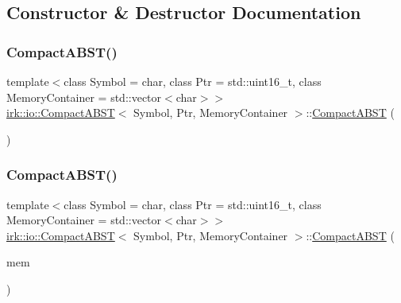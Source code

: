 \subsection{Constructor \& Destructor Documentation}
\mbox{\label{classirk_1_1io_1_1CompactABST_ac974514e8763630b313b9993705aa0ee}} 
\subsubsection{\texorpdfstring{Compact\+A\+B\+S\+T()}{CompactABST()}\hspace{0.1cm}{\footnotesize\ttfamily [1/2]}}
{\footnotesize\ttfamily template$<$class Symbol = char, class Ptr = std\+::uint16\+\_\+t, class Memory\+Container = std\+::vector$<$char$>$$>$ \\
\mbox{\hyperlink{classirk_1_1io_1_1CompactABST}{irk\+::io\+::\+Compact\+A\+B\+ST}}$<$ Symbol, Ptr, Memory\+Container $>$\+::\mbox{\hyperlink{classirk_1_1io_1_1CompactABST}{Compact\+A\+B\+ST}} (\begin{DoxyParamCaption}{ }\end{DoxyParamCaption})\hspace{0.3cm}{\ttfamily [default]}}

\mbox{\label{classirk_1_1io_1_1CompactABST_a107f624adb553882f94ef03d7cd087f7}} 
\subsubsection{\texorpdfstring{Compact\+A\+B\+S\+T()}{CompactABST()}\hspace{0.1cm}{\footnotesize\ttfamily [2/2]}}
{\footnotesize\ttfamily template$<$class Symbol = char, class Ptr = std\+::uint16\+\_\+t, class Memory\+Container = std\+::vector$<$char$>$$>$ \\
\mbox{\hyperlink{classirk_1_1io_1_1CompactABST}{irk\+::io\+::\+Compact\+A\+B\+ST}}$<$ Symbol, Ptr, Memory\+Container $>$\+::\mbox{\hyperlink{classirk_1_1io_1_1CompactABST}{Compact\+A\+B\+ST}} (\begin{DoxyParamCaption}\item[{Memory\+Container}]{mem }\end{DoxyParamCaption})\hspace{0.3cm}{\ttfamily [inline]}}



